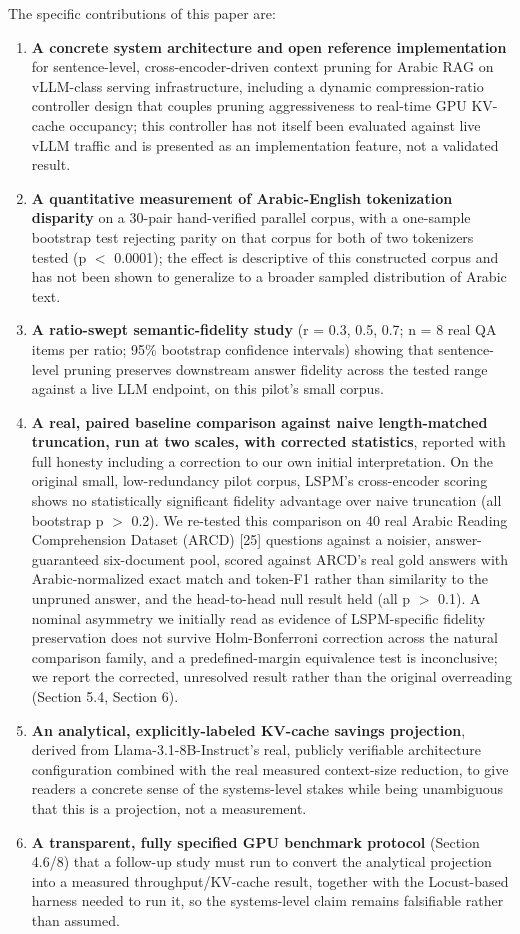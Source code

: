 \documentclass[pdflatex,sn-basic,Numbered]{sn-jnl}
\begin{document}
The specific contributions of this paper are:

\begin{enumerate}
\item \textbf{A concrete system architecture and open reference implementation} for sentence-level, cross-encoder-driven context pruning for Arabic RAG on vLLM-class serving infrastructure, including a dynamic compression-ratio controller design that couples pruning aggressiveness to real-time GPU KV-cache occupancy; this controller has not itself been evaluated against live vLLM traffic and is presented as an implementation feature, not a validated result.
\item \textbf{A quantitative measurement of Arabic-English tokenization disparity} on a 30-pair hand-verified parallel corpus, with a one-sample bootstrap test rejecting parity on that corpus for both of two tokenizers tested (p $<$ 0.0001); the effect is descriptive of this constructed corpus and has not been shown to generalize to a broader sampled distribution of Arabic text.
\item \textbf{A ratio-swept semantic-fidelity study} (r = 0.3, 0.5, 0.7; n = 8 real QA items per ratio; 95\% bootstrap confidence intervals) showing that sentence-level pruning preserves downstream answer fidelity across the tested range against a live LLM endpoint, on this pilot's small corpus.
\item \textbf{A real, paired baseline comparison against naive length-matched truncation, run at two scales, with corrected statistics}, reported with full honesty including a correction to our own initial interpretation. On the original small, low-redundancy pilot corpus, LSPM's cross-encoder scoring shows no statistically significant fidelity advantage over naive truncation (all bootstrap p $>$ 0.2). We re-tested this comparison on 40 real Arabic Reading Comprehension Dataset (ARCD) [25] questions against a noisier, answer-guaranteed six-document pool, scored against ARCD's real gold answers with Arabic-normalized exact match and token-F1 rather than similarity to the unpruned answer, and the head-to-head null result held (all p $>$ 0.1). A nominal asymmetry we initially read as evidence of LSPM-specific fidelity preservation does not survive Holm-Bonferroni correction across the natural comparison family, and a predefined-margin equivalence test is inconclusive; we report the corrected, unresolved result rather than the original overreading (Section 5.4, Section 6).
\item \textbf{An analytical, explicitly-labeled KV-cache savings projection}, derived from Llama-3.1-8B-Instruct's real, publicly verifiable architecture configuration combined with the real measured context-size reduction, to give readers a concrete sense of the systems-level stakes while being unambiguous that this is a projection, not a measurement.
\item \textbf{A transparent, fully specified GPU benchmark protocol} (Section 4.6/8) that a follow-up study must run to convert the analytical projection into a measured throughput/KV-cache result, together with the Locust-based harness needed to run it, so the systems-level claim remains falsifiable rather than assumed.
\end{enumerate}
\end{document}
